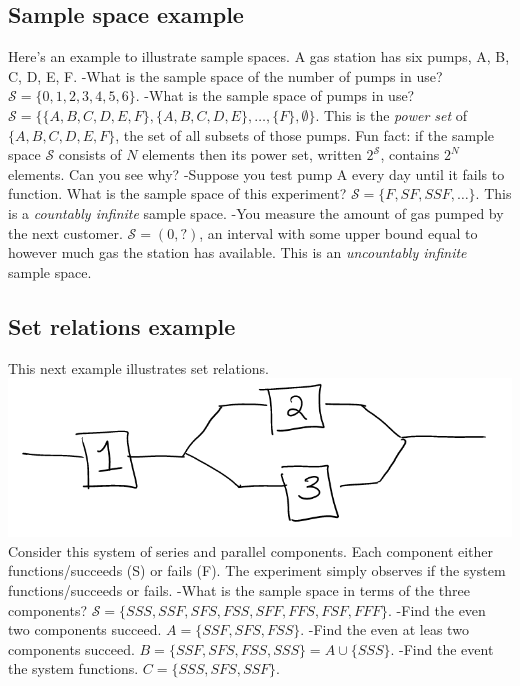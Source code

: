 \documentclass[
]{book}
\begin{document}
\hypertarget{sample-space-example}{%
\subsection{Sample space example}\label{sample-space-example}}

Here's an example to illustrate sample spaces. A gas station has six pumps, A, B, C, D, E, F.
-What is the sample space of the number of pumps in use? \(\mathcal{S} =\{0,1,2,3,4,5,6\}\).
-What is the sample space of pumps in use? \(\mathcal{S} = \{\{A,B,C,D,E,F\},\{A,B,C,D,E\}, \ldots,\{F\}, \emptyset \}\). This is the \emph{power set} of \(\{A,B,C,D,E,F\}\), the set of all subsets of those pumps. Fun fact: if the sample space \(\mathcal{S}\) consists of \(N\) elements then its power set, written \(2^{\mathcal{S}}\), contains \(2^N\) elements. Can you see why?
-Suppose you test pump A every day until it fails to function. What is the sample space of this experiment? \(\mathcal{S} = \{F, SF, SSF, \ldots \}\). This is a \emph{countably infinite} sample space.
-You measure the amount of gas pumped by the next customer. \(\mathcal{S} = (0, ?)\), an interval with some upper bound equal to however much gas the station has available. This is an \emph{uncountably infinite} sample space.

\hypertarget{set-relations-example}{%
\subsection{Set relations example}\label{set-relations-example}}

This next example illustrates set relations.\\
\includegraphics{system.PNG}
Consider this system of series and parallel components. Each component either functions/succeeds (S) or fails (F). The experiment simply observes if the system functions/succeeds or fails.
-What is the sample space in terms of the three components? \(\mathcal{S} = \{SSS, SSF, SFS, FSS, SFF, FFS, FSF, FFF\}\).
-Find the even two components succeed. \(A = \{SSF, SFS, FSS\}\).
-Find the even at leas two components succeed. \(B = \{SSF, SFS, FSS, SSS\} = A\cup \{SSS\}\).
-Find the event the system functions. \(C = \{SSS, SFS, SSF\}\).
\end{document}
